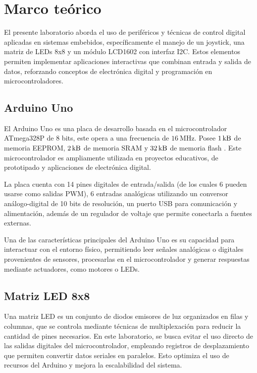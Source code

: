 \section{Marco teórico}
El presente laboratorio aborda el uso de periféricos y técnicas de control digital aplicadas en sistemas embebidos, específicamente el manejo de un joystick, 
una matriz de LEDs 8x8 y un módulo LCD1602 con interfaz I2C. Estos elementos permiten implementar aplicaciones interactivas que combinan entrada y salida de datos,
reforzando conceptos de electrónica digital y programación en microcontroladores.
\subsection{Arduino Uno}
El Arduino Uno es una placa de desarrollo basada en el microcontrolador ATmega328P de $8$ bits, este opera a una
frecuencia de $\SI{16}{\mega \hertz}$. Posee $\SI{1}{\kilo \byte}$ de memoria EEPROM, $\SI{2}{\kilo \byte}$ de memoria 
SRAM y $\SI{32}{\kilo \byte}$ de memoria flash \cite{medina-arduino}. Este microcontrolador es ampliamente utilizada en proyectos educativos,
de prototipado y aplicaciones de electrónica digital.

La placa cuenta con 14 pines digitales de entrada/salida 
(de los cuales 6 pueden usarse como salidas PWM),
6 entradas analógicas utilizando un conversor análogo-digital de 10 bits de resolución, 
un puerto USB para comunicación y alimentación, 
además de un regulador de voltaje que permite conectarla a fuentes externas. 

Una de las características principales del Arduino Uno es su capacidad para interactuar con el entorno físico,
permitiendo leer señales analógicas o digitales provenientes de sensores, procesarlas en el microcontrolador 
y generar respuestas mediante actuadores, como motores o LEDs.


\subsection{Matriz LED 8x8}

Una matriz LED es un conjunto de diodos emisores de luz organizados en filas y columnas, que se controla
mediante técnicas de multiplexación para reducir la cantidad de pines necesarios. En este laboratorio, se
busca evitar el uso directo de las salidas digitales del microcontrolador, empleando registros de
desplazamiento que permiten convertir datos seriales en paralelos. Esto optimiza el uso de recursos del
Arduino y mejora la escalabilidad del sistema.

